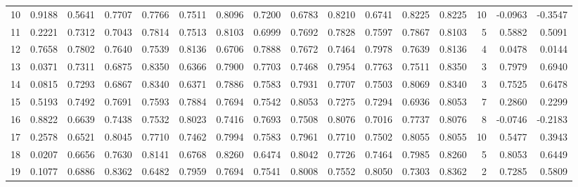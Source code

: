 \begin{tabular}{lrrrrrrrrrrrrrrr}
10 &      0.9188 &  0.5641 &  0.7707 &  0.7766 &  0.7511 &  0.8096 &  0.7200 &  0.6783 &  0.8210 &  0.6741 &   0.8225 &     0.8225 &     10 &                   -0.0963 &                    -0.3547 \\
11 &      0.2221 &  0.7312 &  0.7043 &  0.7814 &  0.7513 &  0.8103 &  0.6999 &  0.7692 &  0.7828 &  0.7597 &   0.7867 &     0.8103 &      5 &                    0.5882 &                     0.5091 \\
12 &      0.7658 &  0.7802 &  0.7640 &  0.7539 &  0.8136 &  0.6706 &  0.7888 &  0.7672 &  0.7464 &  0.7978 &   0.7639 &     0.8136 &      4 &                    0.0478 &                     0.0144 \\
13 &      0.0371 &  0.7311 &  0.6875 &  0.8350 &  0.6366 &  0.7900 &  0.7703 &  0.7468 &  0.7954 &  0.7763 &   0.7511 &     0.8350 &      3 &                    0.7979 &                     0.6940 \\
14 &      0.0815 &  0.7293 &  0.6867 &  0.8340 &  0.6371 &  0.7886 &  0.7583 &  0.7931 &  0.7707 &  0.7503 &   0.8069 &     0.8340 &      3 &                    0.7525 &                     0.6478 \\
15 &      0.5193 &  0.7492 &  0.7691 &  0.7593 &  0.7884 &  0.7694 &  0.7542 &  0.8053 &  0.7275 &  0.7294 &   0.6936 &     0.8053 &      7 &                    0.2860 &                     0.2299 \\
16 &      0.8822 &  0.6639 &  0.7438 &  0.7532 &  0.8023 &  0.7416 &  0.7693 &  0.7508 &  0.8076 &  0.7016 &   0.7737 &     0.8076 &      8 &                   -0.0746 &                    -0.2183 \\
17 &      0.2578 &  0.6521 &  0.8045 &  0.7710 &  0.7462 &  0.7994 &  0.7583 &  0.7961 &  0.7710 &  0.7502 &   0.8055 &     0.8055 &     10 &                    0.5477 &                     0.3943 \\
18 &      0.0207 &  0.6656 &  0.7630 &  0.8141 &  0.6768 &  0.8260 &  0.6474 &  0.8042 &  0.7726 &  0.7464 &   0.7985 &     0.8260 &      5 &                    0.8053 &                     0.6449 \\
19 &      0.1077 &  0.6886 &  0.8362 &  0.6482 &  0.7959 &  0.7694 &  0.7541 &  0.8008 &  0.7552 &  0.8050 &   0.7303 &     0.8362 &      2 &                    0.7285 &                     0.5809 \\
\bottomrule
\end{tabular}
